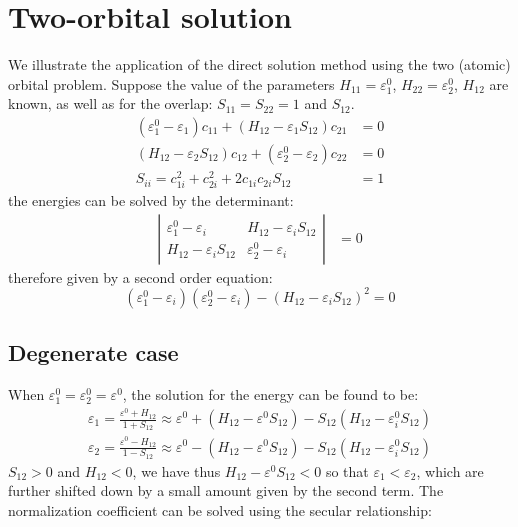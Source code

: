 \documentclass{article}
\begin{document}
\section{Two-orbital solution}
We illustrate the application of the direct solution method using the two (atomic) orbital problem. Suppose the 
value of the parameters $H_{11} = \varepsilon_1^0$, $H_{22} = \varepsilon_2^0$, $H_{12}$ are known, as well as 
for the overlap: $S_{11} = S_{22} = 1$ and $S_{12}$. 
\begin{align}
    (\varepsilon_1^0 - \varepsilon_1) c_{11} + (H_{12} - \varepsilon_1 S_{12}) c_{21} &= 0 \\
    (H_{12} - \varepsilon_2 S_{12}) c_{12} + (\varepsilon_2^0 - \varepsilon_2) c_{22} &= 0 \\ 
    S_{ii} = c_{1i}^2 + c_{2i}^2 + 2 c_{1i} c_{2i} S_{12} &= 1
\end{align}
the energies can be solved by the determinant:
\begin{align}
    \left| \begin{matrix}
        \varepsilon_1^0 - \varepsilon_i & H_{12} - \varepsilon_i S_{12} \\
        H_{12} - \varepsilon_i S_{12} & \varepsilon_2^0 - \varepsilon_i
    \end{matrix} \right| &= 0 
\end{align}
therefore given by a second order equation:
\begin{equation}
    (\varepsilon_1^0 - \varepsilon_i)(\varepsilon_2^0 - \varepsilon_i) - (H_{12} - \varepsilon_i S_{12})^2 = 0
\end{equation}

\subsection*{Degenerate case}
When $\varepsilon_1^0 = \varepsilon_2^0 = \varepsilon^0$, the solution for the energy can be found to be:
\begin{align}
    \varepsilon_1 = \frac{\varepsilon^0 + H_{12}}{1 + S_{12}} \approx \varepsilon^0 + (H_{12} - \varepsilon^0 S_{12}) - S_{12} (H_{12} - \varepsilon_i^0 S_{12}) \\
    \varepsilon_2 = \frac{\varepsilon^0 - H_{12}}{1 - S_{12}} \approx \varepsilon^0 - (H_{12} - \varepsilon^0 S_{12}) - S_{12} (H_{12} - \varepsilon_i^0 S_{12}) 
\end{align}
$S_{12} > 0$ and $H_{12} < 0$, we have thus $H_{12} - \varepsilon^0 S_{12} < 0$ so that $\varepsilon_1 < \varepsilon_2$, which are further shifted down by a small amount 
given by the second term.
The normalization coefficient can be solved using the secular relationship:
\begin{equation}
    
\end{equation}
\end{document}
